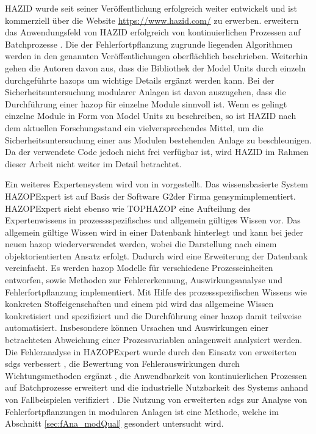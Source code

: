HAZID wurde seit seiner Ver\"offentlichung erfolgreich weiter entwickelt und ist kommerziell \"uber die Website \url{https://www.hazid.com/} zu erwerben. \citeauthor{Palmer_2009} erweitern das Anwendungsfeld von HAZID erfolgreich von kontinuierlichen Prozessen auf Batchprozesse \cite{Palmer_2009}. \newline
Die der Fehlerfortpflanzung zugrunde liegenden Algorithmen werden in den genannten Ver\"offentlichungen oberfl\"achlich beschrieben. Weiterhin gehen die Autoren davon aus, dass die Bibliothek der Model Units durch einzeln durchgef\"uhrte \acp{hazop} um wichtige Details erg\"anzt werden kann. Bei der Sicherheitsuntersuchung modularer Anlagen ist davon auszugehen, dass die Durchf\"uhrung einer \ac{hazop} f\"ur einzelne Module sinnvoll ist. Wenn es gelingt einzelne Module in Form von Model Units zu beschreiben, so ist HAZID nach dem aktuellen Forschungsstand ein vielversprechendes Mittel, um die Sicherheitsuntersuchung einer aus Modulen bestehenden Anlage zu beschleunigen. Da der verwendete Code jedoch nicht frei verf\"ugbar ist, wird HAZID im Rahmen dieser Arbeit nicht weiter im Detail betrachtet.

Ein weiteres Expertensystem wird von \citeauthor{Venkatasubramanian1994} in  \cite{Venkatasubramanian1994} vorgestellt. Das wissensbasierte System HAZOPExpert ist auf Basis der Software \glqq G2\grqq { }der Firma \glqq gensym\grqq { }implementiert. HAZOPExpert sieht ebenso wie TOPHAZOP eine Aufteilung des Expertenwissens in prozesssspezifisches und allgemein g\"ultiges Wissen vor. Das allgemein g\"ultige Wissen wird in einer Datenbank hinterlegt und kann bei jeder neuen \ac{hazop} wiederverwendet werden, wobei die Darstellung nach einem objektorientierten Ansatz erfolgt. Dadurch wird eine Erweiterung der Datenbank vereinfacht. Es werden \ac{hazop} Modelle f\"ur verschiedene Prozesseinheiten entworfen, sowie Methoden zur Fehlererkennung,  Auswirkungsanalyse und Fehlerfortpflanzung implementiert. Mit Hilfe des prozessspezifischen Wissens wie konkreten Stoffeigenschaften und einem \ac{pid} wird das allgemeine Wissen konkretisiert und spezifiziert und die Durchf\"uhrung einer \ac{hazop} damit teilweise automatisiert. Insbesondere k\"onnen Ursachen und Auswirkungen einer betrachteten Abweichung einer Prozessvariablen anlagenweit analysiert werden.  \newline
Die Fehleranalyse in HAZOPExpert wurde durch den Einsatz von erweiterten \acp{sdg} verbessert \cite{Vaidhyanathan_1995}, die Bewertung von Fehlerauswirkungen durch Wichtungsmethoden erg\"anzt \cite{Vaidhyanathan_1996}, die Anwendbarkeit von kontinuierlichen Prozessen auf Batchprozesse erweitert \cite{Venkatasubramanian_2000} und die industrielle Nutzbarkeit des Systems anhand von Fallbeispielen verifiziert \cite{Venkatasubramanian1994,Vaidhyanathan1996,Venkatasubramanian_2000}. Die Nutzung von erweiterten \acp{sdg} zur Analyse von Fehlerfortpflanzungen in modularen Anlagen ist eine Methode, welche im Abschnitt \ref{sec:fAna_modQual} gesondert untersucht wird.

